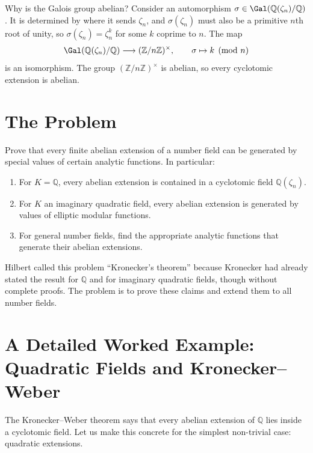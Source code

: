 Why is the Galois group abelian? Consider an automorphism $\sigma \in \Gal(\mathbb{Q}(\zeta_n)/\mathbb{Q})$. It is determined by where it sends $\zeta_n$, and $\sigma(\zeta_n)$ must also be a primitive $n$th root of unity, so $\sigma(\zeta_n) = \zeta_n^k$ for some $k$ coprime to $n$. The map
\[
\Gal(\mathbb{Q}(\zeta_n)/\mathbb{Q}) \longrightarrow (\mathbb{Z}/n\mathbb{Z})^\times,\qquad
\sigma \mapsto k \pmod{n}
\]
is an isomorphism. The group $(\mathbb{Z}/n\mathbb{Z})^\times$ is abelian, so every cyclotomic extension is abelian.

\section{The Problem}

\begin{problem_statement}
Prove that every finite abelian extension of a number field can be generated by special values of certain analytic functions. In particular:
\begin{enumerate}
    \item For $K = \mathbb{Q}$, every abelian extension is contained in a cyclotomic field $\mathbb{Q}(\zeta_n)$.
    \item For $K$ an imaginary quadratic field, every abelian extension is generated by values of elliptic modular functions.
    \item For general number fields, find the appropriate analytic functions that generate their abelian extensions.
\end{enumerate}
\end{problem_statement}

Hilbert called this problem ``Kronecker's theorem'' because Kronecker had already stated the result for $\mathbb{Q}$ and for imaginary quadratic fields, though without complete proofs. The problem is to prove these claims and extend them to all number fields.

\section{A Detailed Worked Example: Quadratic Fields and Kronecker--Weber}

The Kronecker--Weber theorem says that every abelian extension of $\mathbb{Q}$ lies inside a cyclotomic field. Let us make this concrete for the simplest non-trivial case: quadratic extensions.

